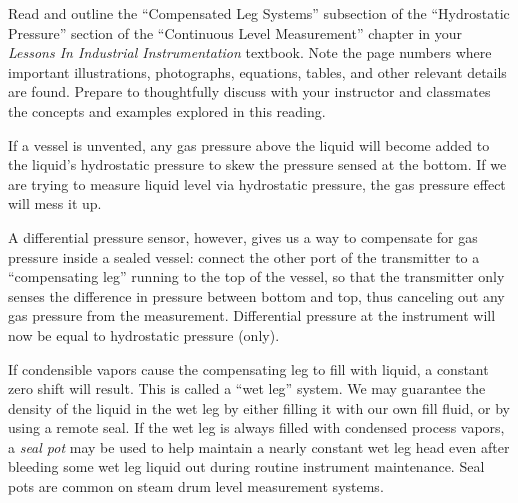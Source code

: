 

Read and outline the ``Compensated Leg Systems'' subsection of the ``Hydrostatic Pressure'' section of the ``Continuous Level Measurement'' chapter in your {\it Lessons In Industrial Instrumentation} textbook.  Note the page numbers where important illustrations, photographs, equations, tables, and other relevant details are found.  Prepare to thoughtfully discuss with your instructor and classmates the concepts and examples explored in this reading.














If a vessel is unvented, any gas pressure above the liquid will become added to the liquid's hydrostatic pressure to skew the pressure sensed at the bottom.  If we are trying to measure liquid level via hydrostatic pressure, the gas pressure effect will mess it up.

A differential pressure sensor, however, gives us a way to compensate for gas pressure inside a sealed vessel: connect the other port of the transmitter to a ``compensating leg'' running to the top of the vessel, so that the transmitter only senses the difference in pressure between bottom and top, thus canceling out any gas pressure from the measurement.  Differential pressure at the instrument will now be equal to hydrostatic pressure (only).

\vskip 10pt

If condensible vapors cause the compensating leg to fill with liquid, a constant zero shift will result.  This is called a ``wet leg'' system.  We may guarantee the density of the liquid in the wet leg by either filling it with our own fill fluid, or by using a remote seal.  If the wet leg is always filled with condensed process vapors, a {\it seal pot} may be used to help maintain a nearly constant wet leg head even after bleeding some wet leg liquid out during routine instrument maintenance.  Seal pots are common on steam drum level measurement systems.

